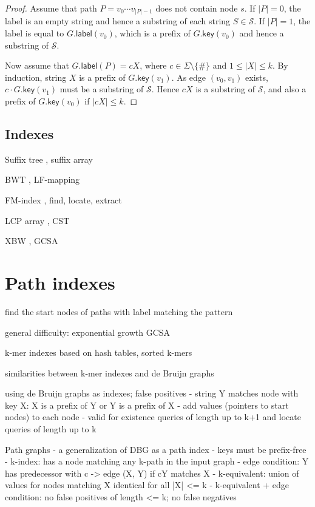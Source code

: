 \documentclass[a4paper,UKenglish]{lipics-v2016}
\newcommand{\set}[1]{\ensuremath{\{ #1 \}}}
\newcommand{\abs}[1]{\ensuremath{\lvert #1 \rvert}}
\newcommand{\glabel}{\ensuremath{\mathsf{label}}}
\newcommand{\gkey}{\ensuremath{\mathsf{key}}}
\begin{document}
\begin{proof}
Assume that path $P = v_{0} \dotsm v_{\abs{P}-1}$ does not contain node $s$. If $\abs{P} = 0$, the label is an empty string and hence a substring of each string $S \in \mathcal{S}$. If $\abs{P} = 1$, the label is equal to $G.\glabel(v_{0})$, which is a prefix of $G.\gkey(v_{0})$ and hence a substring of $\mathcal{S}$.

Now assume that $G.\glabel(P) = cX$, where $c \in \Sigma \setminus \set{\#}$ and $1 \le \abs{X} \le k$. By induction, string $X$ is a prefix of $G.\gkey(v_{1})$. As edge $(v_{0}, v_{1})$ exists, $c \cdot G.\gkey(v_{1})$ must be a substring of $\mathcal{S}$. Hence $cX$ is a substring of $\mathcal{S}$, and also a prefix of $G.\gkey(v_{0})$ if $\abs{cX} \le k$.
\end{proof}

\subsection{Indexes}

Suffix tree \cite{Weiner1973}, suffix array \cite{Manber1993}

BWT \cite{Burrows1994}, LF-mapping

FM-index \cite{Ferragina2005a}, find, locate, extract

LCP array \cite{Manber1993}, CST \cite{Sadakane2007}

XBW \cite{Ferragina2009b}, GCSA \cite{Siren2014}


\section{Path indexes}

find the start nodes of paths with label matching the pattern

general difficulty: exponential growth
GCSA \cite{Siren2014}

k-mer indexes based on hash tables, sorted k-mers

similarities between k-mer indexes and de Bruijn graphs

using de Bruijn graphs as indexes; false positives
- string Y matches node with key X: X is a prefix of Y or Y is a prefix of X
- add values (pointers to start nodes) to each node
- valid for existence queries of length up to k+1 and locate queries of length up to k

Path graphs
- a generalization of DBG as a path index
- keys must be prefix-free
- k-index: has a node matching any k-path in the input graph
- edge condition: Y has predecessor with c -> edge (X, Y) if cY matches X
- k-equivalent: union of values for nodes matching X identical for all |X| <= k
- k-equivalent + edge condition: no false positives of length <= k; no false negatives
\end{document}
